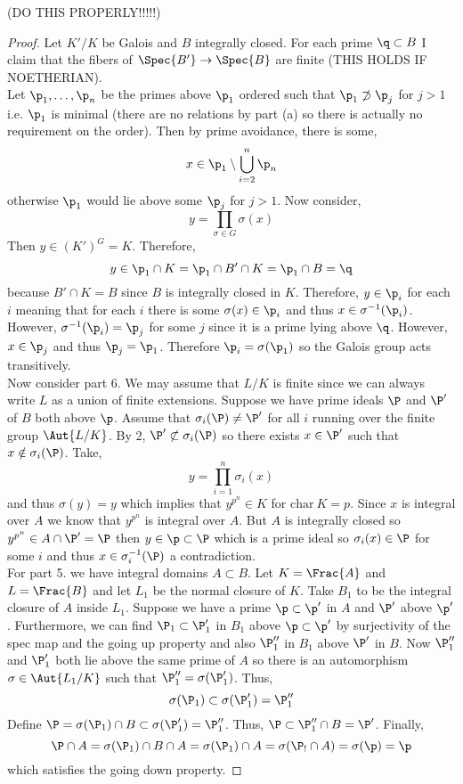 \documentclass[12pt]{article}
\begin{document}
(DO THIS PROPERLY!!!!!)

\begin{proof}
Let $K'/K$ be Galois and $B$ integrally closed. For each prime $\q \subset B$ I claim that the fibers of $\Spec{B'} \to \Spec{B}$ are finite (THIS HOLDS IF NOETHERIAN).
\bigskip\\
Let $\p_1, \dots, \p_n$ be the primes above $\p_1$ ordered such that $\p_1 \not\supset \p_j$ for $j > 1$ i.e. $\p_1$ is minimal (there are no relations by part (a) so there is actually no requirement on the order). Then by prime avoidance, there is some,
\[ x \in \p_1 \setminus \bigcup_{i = 2}^n \p_n \]
otherwise $\p_1$ would lie above some $\p_j$ for $j > 1$.
Now consider,
\[ y = \prod_{\sigma \in G} \sigma(x) \]
Then $y \in (K')^G = K$. Therefore,
\[ y \in \p_1 \cap K = \p_1 \cap B' \cap K = \p_1 \cap B = \q \]
because $B' \cap K = B$ since $B$ is integrally closed in $K$. Therefore, $y \in \p_i$ for each $i$ meaning that for each $i$ there is some $\sigma(x) \in \p_i$ and thus $x \in \sigma^{-1}(\p_i)$. However, $\sigma^{-1}(\p_i) = \p_j$ for some $j$ since it is a prime lying above $\q$. However, $x \in \p_j$ and thus $\p_j = \p_1$. Therefore $\p_i = \sigma(\p_1)$ so the Galois group acts transitively.
\bigskip\\
Now consider part 6. We may assume that $L / K$ is finite since we can always write $L$ as a union of finite extensions. Suppose we have prime ideals $\P$ and $\P'$ of $B$ both above $\p$. Assume that $\sigma_i(\P) \neq \P'$ for all $i$ running over the finite group $\Aut{L/K}$. By 2, $\P' \not\subset \sigma_i(\P)$ so there exists $x \in \P'$ such that $x \notin \sigma_i(\P)$. Take,
\[ y = \prod_{i = 1}^n \sigma_i(x) \]
and thus $\sigma(y) = y$ which implies that $y^{p^n} \in K$ for $\mathrm{char} \: K = p$. Since $x$ is integral over $A$ we know that $y^{p^n}$ is integral over $A$. But $A$ is integrally closed so $y^{p^n} \in A \cap \P' = \P$ then $y \in \p \subset \P$ which is a prime ideal so $\sigma_i(x) \in \P$ for some $i$ and thus $x \in \sigma_i^{-1}(\P)$ a contradiction. 
\bigskip\\
For part 5. we have integral domains $A \subset B$. Let $K = \Frac{A}$ and $L = \Frac{B}$ and let $L_1$ be the normal closure of $K$. Take $B_1$ to be the integral closure of $A$ inside $L_1$. Suppose we have a prime $\p \subset \p'$ in $A$ and $\P'$ above $\p'$. Furthermore, we can find $\P_1 \subset \P_1'$ in $B_1$ above $\p \subset \p'$ by surjectivity of the spec map and the going up property and also $\P_1''$ in $B_1$ above $\P'$ in $B$. Now $\P_1''$ and $\P_1'$ both lie above the same prime of $A$ so there is an automorphism $\sigma \in \Aut{L_1 / K}$ such that $\P_1'' = \sigma(\P_1')$. Thus,
\[ \sigma(\P_1) \subset \sigma(\P_1') = \P_1'' \]
Define $\P = \sigma(\P_1) \cap B \subset \sigma(\P_1') = \P_1''$. Thus, $\P \subset \P_1'' \cap B = \P'$. Finally,
\[ \P \cap A = \sigma(\P_1) \cap B \cap A = \sigma(\P_1) \cap A = \sigma(\P_! \cap A) = \sigma(\p) = \p \]
which satisfies the going down property.    

\end{proof}
\end{document}
